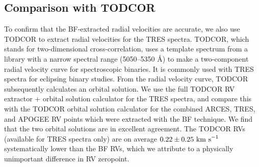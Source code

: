 \subsection{Comparison with TODCOR}\label{todcor}
To confirm that the BF-extracted radial velocities are accurate, we also use TODCOR \citep{zuc94} to extract radial velocities for the TRES spectra. TODCOR, which stands for two-dimensional cross-correlation, uses a template spectrum from a library with a narrow spectral range (5050--5350 \AA) to make a two-component radial velocity curve for spectroscopic binaries. It is commonly used with TRES spectra for eclipsing binary studies. From the radial velocity curve, TODCOR subsequently calculates an orbital solution. We use the full TODCOR RV extractor + orbital solution calculator for the TRES spectra, and compare this with the TODCOR orbital solution calculator for the combined ARCES, TRES, and APOGEE RV points which were extracted with the BF technique. We find that the two orbital solutions are in excellent agreement. The TODCOR RVs (available for TRES spectra only) are on average $0.22 \pm 0.25 \ \rm{km \ s}^{-1}$ systematically lower than the BF RVs, which we attribute to a physically unimportant difference in RV zeropoint.
 
  
  
  
  
  
  
  
  
  
  
  
  